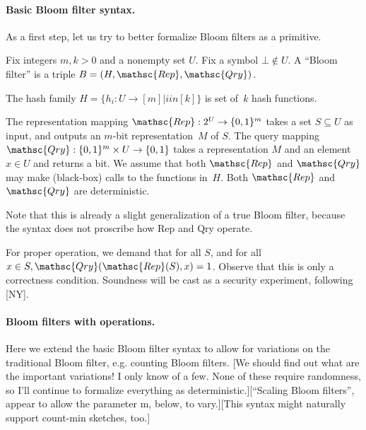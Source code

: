 \paragraph{Basic Bloom filter syntax.}
As a first step, let us try to better formalize Bloom filters as a primitive.

Fix integers $m,k > 0$ and a nonempty set $U$.  Fix a symbol $\bot \not\in U$.  A “Bloom filter” is a triple  $B=(H,\mathsc{Rep},\mathsc{Qry})$.  

The hash family $H = \{h_i : U \rightarrow [m]  | i in [k]\}$ is  set of~$k$ hash functions.  

The representation mapping $\mathsc{Rep}: 2^U \rightarrow \bits^m$ takes a set $S \subseteq U$ as input, and outputs an $m$-bit representation~$M$ of $S$.  The query mapping $\mathsc{Qry}: \bits^m \times U \rightarrow \bits$ takes a representation $M$ and an element $x \in U$ and returns a bit.  We assume that both $\mathsc{Rep}$ and $\mathsc{Qry}$ may make (black-box) calls to the functions in~$H$.  Both $\mathsc{Rep}$ and $\mathsc{Qry}$ are deterministic.

Note that this is already a slight generalization of a true Bloom filter, because the syntax does not proscribe how Rep and Qry operate.


For proper operation, we demand that for all $S$, and for all $x \in S, \mathsc{Qry}(\mathsc{Rep}(S),x)=1$.  Observe that this is only a correctness condition.  Soundness will be cast as a security experiment, following [NY].


\paragraph{Bloom filters with operations. }

Here we extend the basic Bloom filter syntax to allow for variations on the traditional Bloom filter, e.g. counting Bloom filters.  [We should find out what are the important variations! I only know of a few.  None of these require randomness, so I’ll continue to formalize everything as deterministic.][“Scaling Bloom filters”, appear to allow the parameter m, below, to vary.][This syntax might naturally support count-min sketches, too.]

